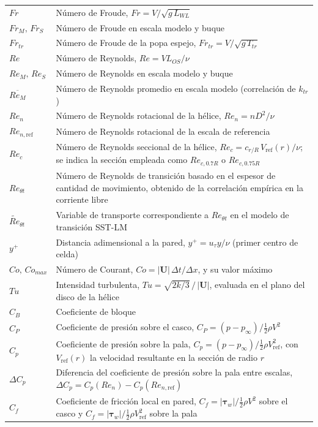 \begin{longtable}{@{}p{} p{}@{}}
$Fr$        & Número de Froude, $Fr = V/\sqrt{g\,L_{WL}}$ \\
$Fr_M,\,Fr_S$ & Número de Froude en escala modelo y buque \\
$Fr_{tr}$   & Número de Froude de la popa espejo, $Fr_{tr} = V/\sqrt{g\,T_{tr}}$ \\
$Re$        & Número de Reynolds, $Re = V L_{OS}/\nu$ \\
$Re_M,\,Re_S$ & Número de Reynolds en escala modelo y buque \\
$\overline{Re_M}$ & Número de Reynolds promedio en escala modelo (correlación de $k_{tr}$) \\
$Re_n$      & Número de Reynolds rotacional de la hélice, $Re_n = n D^2/\nu$ \\
$Re_{n,\mathrm{ref}}$ & Número de Reynolds rotacional de la escala de referencia \\
$Re_c$      & Número de Reynolds seccional de la hélice, $Re_c = c_{r/R}\,V_{\text{ref}}(r)/\nu$; se indica la sección empleada como $Re_{c,0.7R}$ o $Re_{c,0.75R}$ \\
$Re_{\theta t}$ & Número de Reynolds de transición basado en el espesor de cantidad de movimiento, obtenido de la correlación empírica en la corriente libre \\
$\widetilde{Re}_{\theta t}$ & Variable de transporte correspondiente a $Re_{\theta t}$ en el modelo de transición SST-LM \\
$y^+$       & Distancia adimensional a la pared, $y^+ = u_\tau y/\nu$ (primer centro de celda) \\
$Co,\,Co_{max}$ & Número de Courant, $Co = |\mathbf{U}|\,\Delta t/\Delta x$, y su valor máximo \\
$Tu$        & Intensidad turbulenta, $Tu = \sqrt{2k/3}\,/\,|\mathbf{U}|$, evaluada en el plano del disco de la hélice \\
$C_B$       & Coeficiente de bloque \\
$C_P$       & Coeficiente de presión sobre el casco, $C_P = (p-p_\infty)/\tfrac{1}{2}\rho V^2$ \\
$C_p$       & Coeficiente de presión sobre la pala, $C_p = (p-p_\infty)/\tfrac{1}{2}\rho V_{\text{ref}}^2$, con $V_{\text{ref}}(r)$ la velocidad resultante en la sección de radio $r$ \\
$\Delta C_p$ & Diferencia del coeficiente de presión sobre la pala entre escalas, $\Delta C_p = C_p(Re_n) - C_p(Re_{n,\mathrm{ref}})$ \\
$C_f$       & Coeficiente de fricción local en pared, $C_f = |\boldsymbol{\tau}_w|/\tfrac{1}{2}\rho V^2$ sobre el casco y $C_f = |\boldsymbol{\tau}_w|/\tfrac{1}{2}\rho V_{\text{ref}}^2$ sobre la pala \\
\end{longtable}

